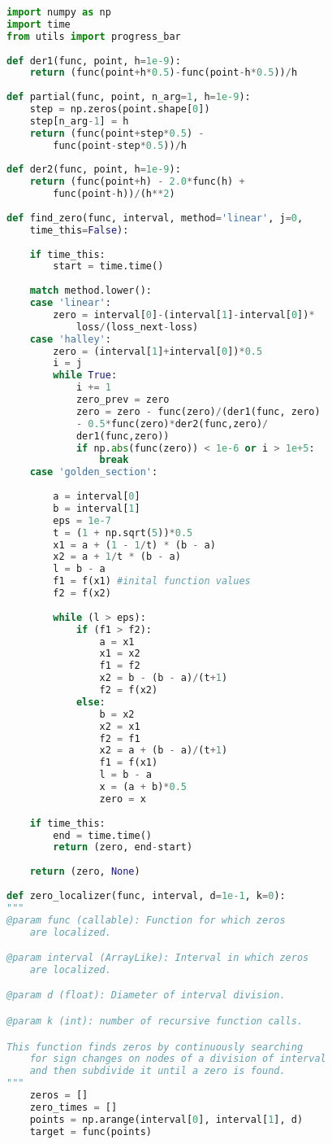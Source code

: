 \begin{lstlisting}[language=Python, showstringspaces=false, caption=Файл \texttt{math\_utils.py}.]
import numpy as np
import time
from utils import progress_bar
	
def der1(func, point, h=1e-9):
	return (func(point+h*0.5)-func(point-h*0.5))/h
	
def partial(func, point, n_arg=1, h=1e-9):
	step = np.zeros(point.shape[0])
	step[n_arg-1] = h
	return (func(point+step*0.5) - 
		func(point-step*0.5))/h
	
def der2(func, point, h=1e-9):
	return (func(point+h) - 2.0*func(h) + 
		func(point-h))/(h**2)
	
def find_zero(func, interval, method='linear', j=0, 
	time_this=False):   
	
	if time_this:
		start = time.time()
	
	match method.lower():
	case 'linear':
		zero = interval[0]-(interval[1]-interval[0])*
			loss/(loss_next-loss)
	case 'halley':
		zero = (interval[1]+interval[0])*0.5
		i = j
		while True:
			i += 1
			zero_prev = zero 
			zero = zero - func(zero)/(der1(func, zero)
			- 0.5*func(zero)*der2(func,zero)/
			der1(func,zero))
			if np.abs(func(zero)) < 1e-6 or i > 1e+5:
				break
	case 'golden_section':
	
		a = interval[0]
		b = interval[1] 
		eps = 1e-7
		t = (1 + np.sqrt(5))*0.5
		x1 = a + (1 - 1/t) * (b - a)
		x2 = a + 1/t * (b - a)
		l = b - a
		f1 = f(x1) #inital function values
		f2 = f(x2)
		
		while (l > eps): 
			if (f1 > f2):
				a = x1
				x1 = x2
				f1 = f2
				x2 = b - (b - a)/(t+1)
				f2 = f(x2)
			else:
				b = x2
				x2 = x1
				f2 = f1
				x2 = a + (b - a)/(t+1)
				f1 = f(x1)
				l = b - a
				x = (a + b)*0.5
				zero = x
	
	if time_this:
		end = time.time()
		return (zero, end-start)
	
	return (zero, None)
	
def zero_localizer(func, interval, d=1e-1, k=0):
""" 
@param func (callable): Function for which zeros 
	are localized. 

@param interval (ArrayLike): Interval in which zeros 
	are localized. 

@param d (float): Diameter of interval division.

@param k (int): number of recursive function calls. 

This function finds zeros by continuously searching 
	for sign changes on nodes of a division of interval 
	and then subdivide it until a zero is found.
"""
	zeros = []
	zero_times = []
	points = np.arange(interval[0], interval[1], d)
	target = func(points)
	

\end{lstlisting}
